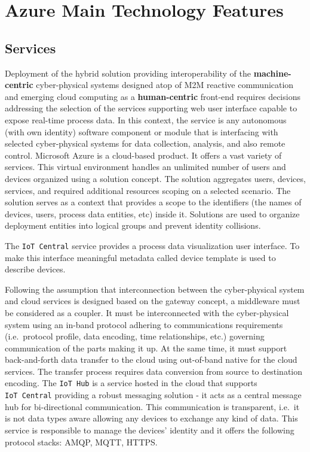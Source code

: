 \documentclass[
]{article}
\date{}
\begin{document}
\hypertarget{azure-main-technology-features}{%
\section{Azure Main Technology
Features}\label{azure-main-technology-features}}

\hypertarget{services}{%
\subsection{Services}\label{services}}

Deployment of the hybrid solution providing interoperability of the
\textbf{machine-centric} cyber-physical systems designed atop of M2M
reactive communication and emerging cloud computing as a
\textbf{human-centric} front-end requires decisions addressing the
selection of the services supporting web user interface capable to
expose real-time process data. In this context, the service is any
autonomous (with own identity) software component or module that is
interfacing with selected cyber-physical systems for data collection,
analysis, and also remote control. Microsoft Azure is a cloud-based
product. It offers a vast variety of services. This virtual environment
handles an unlimited number of users and devices organized using a
solution concept. The solution aggregates users, devices, services, and
required additional resources scoping on a selected scenario. The
solution serves as a context that provides a scope to the identifiers
(the names of devices, users, process data entities, etc) inside it.
Solutions are used to organize deployment entities into logical groups
and prevent identity collisions.

The \texttt{IoT\ Central} service provides a process data visualization
user interface. To make this interface meaningful metadata called device
template is used to describe devices.

Following the assumption that interconnection between the cyber-physical
system and cloud services is designed based on the gateway concept, a
middleware must be considered as a coupler. It must be interconnected
with the cyber-physical system using an in-band protocol adhering to
communications requirements (i.e.~protocol profile, data encoding, time
relationships, etc.) governing communication of the parts making it up.
At the same time, it must support back-and-forth data transfer to the
cloud using out-of-band native for the cloud services. The transfer
process requires data conversion from source to destination encoding.
The \texttt{IoT\ Hub} is a service hosted in the cloud that supports
\texttt{IoT\ Central} providing a robust messaging solution - it acts as
a central message hub for bi-directional communication. This
communication is transparent, i.e.~it is not data types aware allowing
any devices to exchange any kind of data. This service is responsible to
manage the devices' identity and it offers the following protocol
stacks: AMQP, MQTT, HTTPS.
\end{document}
